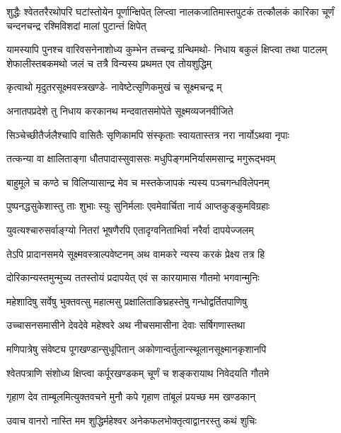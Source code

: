 {शुद्धैः श्वेततरैरथोपरि घटांस्तोयेन पूर्णान्क्षिपेत्}
{लिप्त्वा नालकजातिमास्तपुटकं तत्कौलकं कारिका}
{चूर्णं चन्दनचन्द्र रश्मिविशदां मालां पुटान्तं क्षिपेत्}

\twolineshloka
{यामस्यापि पुनश्च वारिवसनेनाशोध्य कुम्भेन तच्चन्द्र ग्रन्थिमथो-}
{निधाय बकुलं क्षिप्त्वा तथा पाटलम्}%
शेफालीस्तबकमथो जलं च तत्रै
विन्यस्य प्रथमत एव तोयशुद्धिम्

\twolineshloka
{कृत्वाथो मृदुतरसूक्ष्मवस्त्रखण्डे-}
{नावेष्टेत्सृणिकमुखं च सूक्ष्मचन्द्र म्}%

\twolineshloka
{अनातपप्रदेशे तु निधाय करकानथ}
{मन्दवातसमोपेते सूक्ष्मव्यजनवीजिते}%

\twolineshloka
{सिञ्चेच्छीतैर्जलैश्चापि वासितैः सृणिकामपि}
{संस्कृताः स्वायतास्तत्र नरा नार्योऽथवा नृपाः}%

\twolineshloka
{तत्कन्या वा क्षालिताङ्गा धौतपादास्सुवाससः}
{मधुपिङ्गमनिर्यासमसान्द्र मगुरूद्भवम्}%

\twolineshloka
{बाहुमूले च कण्ठे च विलिप्यासान्द्र मेव च}
{मस्तकेजापकं न्यस्य पञ्चगन्धविलेपनम्}%

\twolineshloka
{पुष्पनद्धसुकेशास्तु ताः शुभाः स्युः सुनिर्मलाः}
{एवमेवार्चिता नार्य आप्तकुङ्कुमविग्रहाः}%

\twolineshloka
{युवत्यश्चारुसर्वाङ्ग्यो नितरां भूषणैरपि}
{एतादृग्वनिताभिर्वा नरैर्वा दापयेज्जलम्}%

\twolineshloka
{तेऽपि प्रादानसमये सूक्ष्मवस्त्राल्पवेष्टनम्}
{अथ वामकरे न्यस्य करकं प्रेक्ष्य तत्र हि}%

\twolineshloka
{दोरिकान्यस्तमुन्मुच्य ततस्तोयं प्रदापयेत्}
{एवं स कारयामास गौतमो भगवान्मुनिः}%

\twolineshloka
{महेशादिषु सर्वेषु भुक्तवत्सु महात्मसु}
{प्रक्षालिताङिघ्रहस्तेषु गन्धोद्वर्तितपाणिषु}%

\twolineshloka
{उच्चासनसमासीने देवदेवे महेश्वरे}
{अथ नीचसमासीना देवाः सर्षिगणास्तथा}%

\twolineshloka
{मणिपात्रेषु संवेष्ट्य पूगखण्डान्सुधूपितान्}
{अकोणान्वर्तुलान्स्थूलानसूक्ष्मानकृशानपि}%

\twolineshloka
{श्वेतपत्राणि संशोध्य क्षिप्त्वा कर्पूरखण्डकम्}
{चूर्णं च शङ्करायाथ निवेदयति गौतमे}%

\twolineshloka
{गृहाण देव ताम्बूलमित्युक्तवचने मुनौ}
{कपे गृहाण तांबूलं प्रयच्छ मम खण्डकान्}%

\twolineshloka
{उवाच वानरो नास्ति मम शुद्धिर्महेश्वर}
{अनेकफलभोक्तृत्वाद्वानरस्तु कथं शुचिः}%

